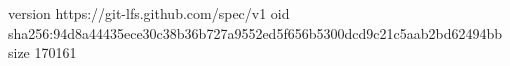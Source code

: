 version https://git-lfs.github.com/spec/v1
oid sha256:94d8a44435ece30c38b36b727a9552ed5f656b5300dcd9c21c5aab2bd62494bb
size 170161

